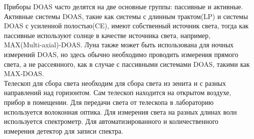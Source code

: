 \documentclass[a4paper,14pt]{article}
\theoremstyle{plain}
\theoremstyle{definition}
\theoremstyle{remark}
\newcommand{\nl}{\\ \indent}
\begin{document}
Приборы DOAS часто делятся на две основные группы: пассивные 
и активные. 
Активные системы DOAS, такие как системы с длинным трактом(LP) 
и системы DOAS с усиленной полостью(CE), имеют собственный
источник света, тогда как пассивные используют солнце в качестве
источника света, например, MAX(Multi-axial)-DOAS. 
Луна также может быть использована для ночных измерений DOAS, 
но здесь обычно необходимо проводить измерения прямого света,
а не рассеянного, как в случае с пассивными системами DOAS,
такими как MAX-DOAS.
\nl
Телескоп для сбора света необходим для сбора  света из зенита
и с разных направлений над горизонтом. 
Сам телескоп находится на открытом воздухе, прибор в помещении.
Для передачи света от телескопа в лабораторию используется
волоконная оптика. 
Для измерения света на разных длинах волн используется
спектрометр. 
Для автоматизированного и количественного измерения детектор для
записи спектра.
\end{document}
